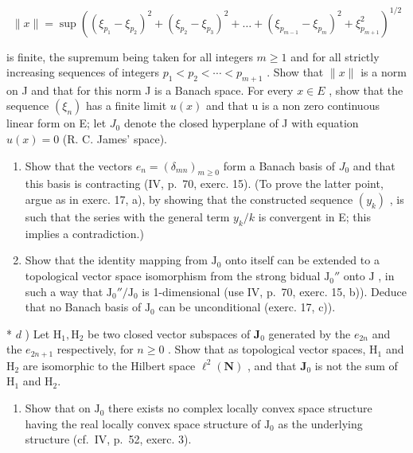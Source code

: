\[
\| x \| = \sup \left(\left(\xi_ {p _ {1}} - \xi_ {p _ {2}}\right) ^ {2} + \left(\xi_ {p _ {2}} - \xi_ {p _ {3}}\right) ^ {2} + \dots + \left(\xi_ {p _ {m - 1}} - \xi_ {p _ {m}}\right) ^ {2} + \xi_ {p _ {m + 1}} ^ {2}\right) ^ {1 / 2}
\]

is finite, the supremum being taken for all integers \(m \geqslant 1\) and for all strictly increasing sequences of integers \(p_{1} < p_{2} < \cdots < p_{m+1}\) . Show that \(\|x\|\) is a norm on J and that for this norm J is a Banach space. For every \(x \in E\) , show that the sequence \((\xi_{n})\) has a finite limit \(u(x)\) and that u is a non zero continuous linear form on E; let \(J_{0}\) denote the closed hyperplane of J with equation \(u(x) = 0\) (R. C. James' space).

\begin{enumerate}
\def\labelenumi{\alph{enumi})}
\setcounter{enumi}{1}
\item
  Show that the vectors \(e_n = (\delta_{mn})_{m \geq 0}\) form a Banach basis of \(J_0\) and that this basis is contracting (IV, p.~70, exerc. 15). (To prove the latter point, argue as in exerc. 17, a), by showing that the constructed sequence \((y_k)\) , is such that the series with the general term \(y_k / k\) is convergent in E; this implies a contradiction.)
\item
  Show that the identity mapping from \(\mathrm{J}_0\) onto itself can be extended to a topological vector space isomorphism from the strong bidual \(\mathrm{J}_0''\) onto \(\mathrm{J}\) , in such a way that \(\mathrm{J}_0'' / \mathrm{J}_0\) is 1-dimensional (use IV, p.~70, exerc. 15, b)). Deduce that no Banach basis of \(\mathrm{J}_0\) can be unconditional (exerc. 17, c)).
\end{enumerate}

* \(d\) ) Let \(\mathrm{H}_1,\mathrm{H}_2\) be two closed vector subspaces of \(\mathbf{J}_0\) generated by the \(e_{2n}\) and the \(e_{2n + 1}\) respectively, for \(n\geqslant 0\) . Show that as topological vector spaces, \(\mathrm{H}_{1}\) and \(\mathrm{H}_{2}\) are isomorphic to the Hilbert space \(\ell^2 (\mathbf{N})\) , and that \(\mathbf{J}_0\) is not the sum of \(\mathrm{H}_1\) and \(\mathrm{H}_2.\)

\begin{enumerate}
\def\labelenumi{\alph{enumi})}
\setcounter{enumi}{4}
\tightlist
\item
  Show that on \(\mathrm{J}_0\) there exists no complex locally convex space structure having the real locally convex space structure of \(\mathrm{J}_0\) as the underlying structure (cf.~IV, p.~52, exerc. 3).
\end{enumerate}

